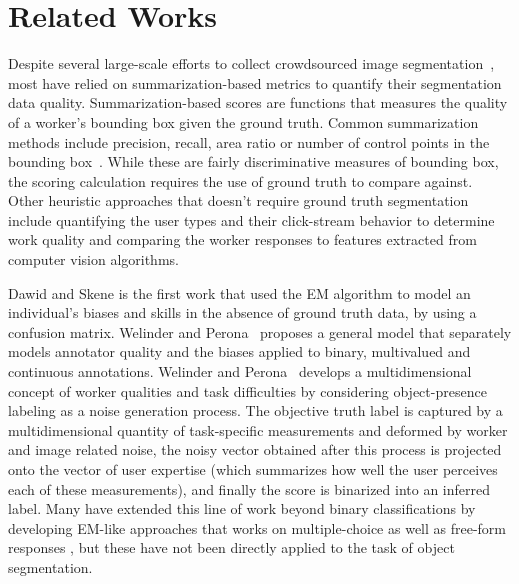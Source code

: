 \documentclass[letterpaper]{article} %
\begin{document}
\section{Related Works}
\par Despite several large-scale efforts to collect crowdsourced image segmentation~\cite{Lin2014,MartinFTM01,Torralba2010,pascal-voc-2012}, most have relied on summarization-based metrics to quantify their segmentation data quality. Summarization-based scores are functions that measures the quality of a worker's bounding box given the ground truth. Common summarization methods include precision, recall, area ratio or number of control points in the bounding box~\cite{Vittayakorn2011}. While these are fairly discriminative measures of bounding box, the scoring calculation requires the use of ground truth to compare against. Other heuristic approaches that doesn't require ground truth segmentation include quantifying the user types and their click-stream behavior to determine work quality\cite{Cabezas2015,Sameki2015} and comparing the worker responses to features extracted from computer vision algorithms\cite{Vittayakorn2011,Russakovsky2015}.
\par Dawid and Skene is the first work that used the EM algorithm to model an individual's biases and skills in the absence of ground truth data, by using a confusion matrix. Welinder and Perona~ proposes a general model that separately models annotator quality and the biases applied to binary, multivalued and continuous annotations. Welinder and Perona~ develops a multidimensional concept of worker qualities and task difficulties by considering object-presence labeling as a noise generation process. The objective truth label is captured by a multidimensional quantity of task-specific measurements and deformed by worker and image related noise, the noisy vector obtained after this process is projected onto the vector of user expertise (which summarizes how well the user perceives each of these measurements), and finally the score is binarized into an inferred label. Many have extended this line of work beyond binary classifications by developing EM-like approaches that works on multiple-choice \cite{Karger2013} as well as free-form responses \cite{Lin2012}, but these have not been directly applied to the task of object segmentation.
\end{document}
